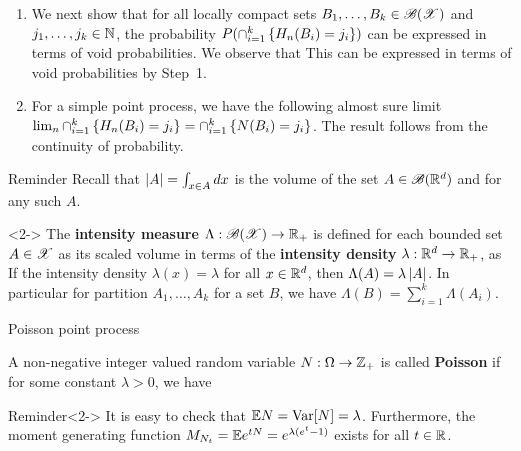 \documentclass[12pt,aspectratio=169]{beamer}
\begin{document}
\begin{frame}
\begin{Proof}
\begin{enumerate}
\item[\bf{Step 3:}]  
We next show that for all locally compact sets $B_1, \dots, B_k \in \mathscr{B}(\mathscr{X})$ and $j_1, \dots, j_k \in \mathbb{N}$, 
the probability $P(\cap_{i=1}^k\left\{H_n(B_i) = j_i\right\})$ can be expressed in terms of void probabilities. 
We observe that 
This can be expressed in terms of void probabilities by Step~1. 
\item[\bf{Step 4:}]<2-> For a simple point process, we have the following almost sure limit $\lim_n\cap_{i=1}^k\left\{H_n(B_i) = j_i\right\} = \cap_{i=1}^k\left\{N(B_i) = j_i\right\}$. 
The result follows from the continuity of probability.
\end{enumerate}
\end{Proof}
\end{frame}


\begin{frame}
\begin{block}{Reminder} 
Recall that $\left\lvert A\right\rvert = \int_{x \in A}dx$ is the volume of the set $A \in \mathscr{B}(\mathbb{R}^d)$ and for any such $A$.
\end{block}
\begin{Definition}<2->
The \textbf{intensity measure} $\Lambda:\mathscr{B}(\mathscr{X})\to\mathbb{R}_+$ is defined for each bounded set $A \in \mathscr{X}$ as its scaled volume 
in terms of the \textbf{intensity density} $\lambda: \mathbb{R}^d \to \mathbb{R}_+$, as 
If the intensity density $\lambda(x) = \lambda$ for all $x \in \mathbb{R}^d$, then $\Lambda(A) = \lambda\left\lvert A\right\rvert$. 
In particular for partition $A_1, \dots, A_k$ for a set $B$, we have $\Lambda(B) = \sum_{i=1}^k\Lambda(A_i)$. 
\end{Definition}
\end{frame}


\begin{frame}{Poisson point process}
\begin{Definition}
A non-negative integer valued random variable $N: \Omega \to \mathbb{Z}_+$ is called \textbf{Poisson} if 
for some constant $\lambda > 0$, we have 
\end{Definition}
\begin{block}{Reminder}<2->
It is easy to check that $\mathbb{E} N = \operatorname{Var}[N] = \lambda$. 
Furthermore, the moment generating function $M_{N_t} = \mathbb{E} e^{t N} = e^{\lambda(e^{t} - 1)}$ exists for all $t \in \mathbb{R}$. 
\end{block}
\end{frame}
\end{document}
